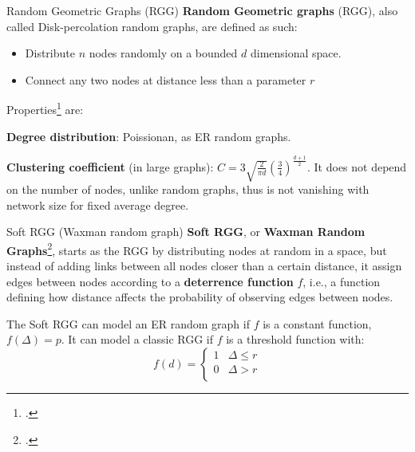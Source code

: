 \documentclass[a4paper,11pt]{book}
\begin{document}
\begin{textbox}{Random Geometric Graphs (RGG)}
\textbf{Random Geometric graphs} (RGG), also called Disk-percolation random graphs, are defined as such:
\begin{itemize}
    \item Distribute $n$ nodes randomly on a bounded $d$ dimensional space.
    \item Connect any two nodes at distance less than a parameter $r$
\end{itemize}

Properties\footcite{dall2002random} are:

\textbf{Degree distribution}: Poissionan, as ER random graphs.

\textbf{Clustering coefficient} (in large graphs): $C=3\sqrt{\frac{2}{\pi d}}(\frac{3}{4})^{\frac{d+1}{2}}$. It does not depend on the number of nodes, unlike random graphs, thus is not vanishing with network size for fixed average degree.

\end{textbox}


\begin{textbox}{Soft RGG (Waxman random graph)}
\textbf{Soft RGG}, or \textbf{Waxman Random Graphs}\footcite{waxman1988routing}, starts as the RGG by distributing nodes at random in a space, but instead of adding links between all nodes closer than a certain distance, it assign edges between nodes according to a \textbf{deterrence function} $f$, i.e., a function defining how distance affects the probability of observing edges between nodes.

The Soft RGG can model an ER random graph if  $f$ is a constant function, $f(\Delta)=p$.
It can model a classic RGG if $f$ is a threshold function with:
\[
f(d)=\begin{cases} 
      1 & \Delta\leq r \\
      0 & \Delta> r \\
   \end{cases}
\]
\end{textbox}
\end{document}
